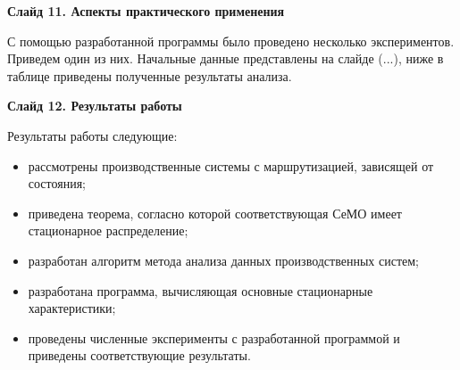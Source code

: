 \documentclass[a4paper,14pt]{extarticle}
\theoremstyle{note}
\begin{document}
\textbf{Слайд 11. Аспекты практического применения}

С помощью разработанной программы было проведено несколько экспериментов. Приведем один из них. Начальные данные представлены на слайде (...), ниже в таблице приведены полученные результаты анализа.


\textbf{Слайд 12. Результаты работы}

Результаты работы следующие:

\begin{itemize}
\item рассмотрены производственные системы с маршрутизацией, зависящей от состояния;
\item приведена теорема, согласно которой соответствующая СеМО имеет стационарное распределение;
\item разработан алгоритм метода анализа данных производственных систем;
\item разработана программа, вычисляющая основные стационарные характеристики;
\item проведены численные эксперименты с разработанной программой и приведены соответствующие результаты.
\end{itemize}
\end{document}
